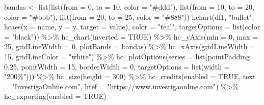 \documentclass[
]{book}
\newenvironment{Shaded}{\begin{snugshade}}{\end{snugshade}}
\newcommand{\AttributeTok}[1]{\textcolor[rgb]{0.77,0.63,0.00}{#1}}
\newcommand{\ConstantTok}[1]{\textcolor[rgb]{0.00,0.00,0.00}{#1}}
\newcommand{\DecValTok}[1]{\textcolor[rgb]{0.00,0.00,0.81}{#1}}
\newcommand{\FloatTok}[1]{\textcolor[rgb]{0.00,0.00,0.81}{#1}}
\newcommand{\FunctionTok}[1]{\textcolor[rgb]{0.00,0.00,0.00}{#1}}
\newcommand{\NormalTok}[1]{#1}
\newcommand{\OtherTok}[1]{\textcolor[rgb]{0.56,0.35,0.01}{#1}}
\newcommand{\SpecialCharTok}[1]{\textcolor[rgb]{0.00,0.00,0.00}{#1}}
\newcommand{\StringTok}[1]{\textcolor[rgb]{0.31,0.60,0.02}{#1}}
\begin{document}
\begin{Shaded}
\begin{Highlighting}[]
\NormalTok{bandas }\OtherTok{\textless{}{-}} \FunctionTok{list}\NormalTok{(}\FunctionTok{list}\NormalTok{(}\AttributeTok{from =} \DecValTok{0}\NormalTok{, }\AttributeTok{to =} \DecValTok{10}\NormalTok{, }\AttributeTok{color =} \StringTok{"\#ddd"}\NormalTok{), }\FunctionTok{list}\NormalTok{(}\AttributeTok{from =} \DecValTok{10}\NormalTok{, }
  \AttributeTok{to =} \DecValTok{20}\NormalTok{, }\AttributeTok{color =} \StringTok{"\#bbb"}\NormalTok{), }\FunctionTok{list}\NormalTok{(}\AttributeTok{from =} \DecValTok{20}\NormalTok{, }\AttributeTok{to =} \DecValTok{25}\NormalTok{, }\AttributeTok{color =} \StringTok{"\#888"}\NormalTok{))}
\FunctionTok{hchart}\NormalTok{(df1, }\StringTok{"bullet"}\NormalTok{, }\FunctionTok{hcaes}\NormalTok{(}\AttributeTok{x =}\NormalTok{ name, }\AttributeTok{y =}\NormalTok{ y, }\AttributeTok{target =}\NormalTok{ value), }
  \AttributeTok{color =} \StringTok{"teal"}\NormalTok{, }\AttributeTok{targetOptions =} \FunctionTok{list}\NormalTok{(}\AttributeTok{color =} \StringTok{"black"}\NormalTok{)) }\SpecialCharTok{\%\textgreater{}\%} 
  \FunctionTok{hc\_chart}\NormalTok{(}\AttributeTok{inverted =} \ConstantTok{TRUE}\NormalTok{) }\SpecialCharTok{\%\textgreater{}\%} \FunctionTok{hc\_yAxis}\NormalTok{(}\AttributeTok{min =} \DecValTok{0}\NormalTok{, }\AttributeTok{max =} \DecValTok{25}\NormalTok{, }
  \AttributeTok{gridLineWidth =} \DecValTok{0}\NormalTok{, }\AttributeTok{plotBands =}\NormalTok{ bandas) }\SpecialCharTok{\%\textgreater{}\%} \FunctionTok{hc\_xAxis}\NormalTok{(}\AttributeTok{gridLineWidth =} \DecValTok{15}\NormalTok{, }
  \AttributeTok{gridLineColor =} \StringTok{"white"}\NormalTok{) }\SpecialCharTok{\%\textgreater{}\%} \FunctionTok{hc\_plotOptions}\NormalTok{(}\AttributeTok{series =} \FunctionTok{list}\NormalTok{(}\AttributeTok{pointPadding =} \FloatTok{0.25}\NormalTok{, }
  \AttributeTok{pointWidth =} \DecValTok{15}\NormalTok{, }\AttributeTok{borderWidth =} \DecValTok{0}\NormalTok{, }\AttributeTok{targetOptions =} \FunctionTok{list}\NormalTok{(}\AttributeTok{width =} \StringTok{"200\%"}\NormalTok{))) }\SpecialCharTok{\%\textgreater{}\%} 
  \FunctionTok{hc\_size}\NormalTok{(}\AttributeTok{height =} \DecValTok{300}\NormalTok{) }\SpecialCharTok{\%\textgreater{}\%} \FunctionTok{hc\_credits}\NormalTok{(}\AttributeTok{enabled =} \ConstantTok{TRUE}\NormalTok{, }
  \AttributeTok{text =} \StringTok{"InvestigaOnline.com"}\NormalTok{, }\AttributeTok{href =} \StringTok{"https://www.investigaonline.com"}\NormalTok{) }\SpecialCharTok{\%\textgreater{}\%} 
  \FunctionTok{hc\_exporting}\NormalTok{(}\AttributeTok{enabled =} \ConstantTok{TRUE}\NormalTok{)}
\end{Highlighting}
\end{Shaded}
\end{document}
